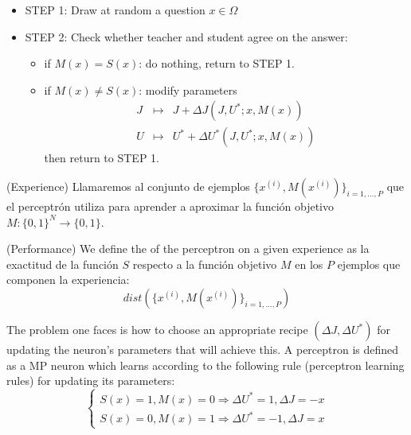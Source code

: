 \begin{itemize}
    \item STEP 1: Draw at random a question $x \in \Omega$
    \item STEP 2: Check whether teacher and student agree on the answer:
    \begin{itemize}
        \item if $M (x) = S(x)$: do nothing, return to STEP 1.
        \item if $M (x) \neq S(x)$: modify parameters
        \begin{equation*}
            \begin{array}{ccc}
                J & \longmapsto & J + \Delta J(J, U^* ; x, M(x)) \\
                U & \longmapsto & U^* + \Delta U^*(J, U^* ; x, M(x))
            \end{array}
        \end{equation*}
        then return to STEP 1.
    \end{itemize}
\end{itemize}

\begin{definicion}(Experience)
    Llamaremos  al conjunto de ejemplos $\{x^{(i)}, M(x^{(i)})\}_{i=1,\dots,P}$ que el perceptrón utiliza para aprender a aproximar la función objetivo $M : \{0, 1\}^N \rightarrow \{0, 1\}$.
\end{definicion}

\begin{definicion}(Performance)
    We define the  of the perceptron on a given experience as la exactitud de la función $S$ respecto a la función objetivo $M$ en los $P$ ejemplos que componen la experiencia:
    \begin{equation*}
        dist(\{x^{(i)}, M(x^{(i)})\}_{i=1,\dots,P})
    \end{equation*}
\end{definicion}

\noindent
The problem one faces is how to choose an appropriate recipe $(\Delta J , \Delta U^* )$ for updating the neuron’s parameters that will achieve this. A perceptron is defined as a MP neuron which learns according to the following rule (perceptron learning rules) for updating its parameters:
\begin{equation*}
    \begin{cases}
        S(x) = 1 , M (x) = 0 \Rightarrow \Delta U^* = 1 , \Delta J = -x \\
        S(x) = 0 , M (x) = 1 \Rightarrow \Delta U^* = -1 , \Delta J = x
    \end{cases}
\end{equation*}

